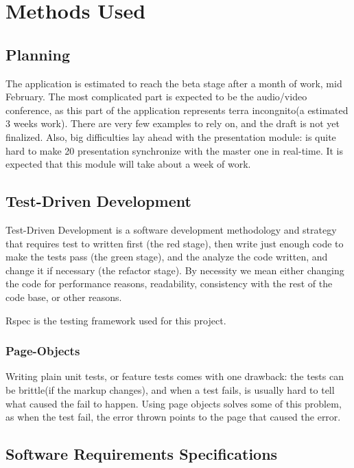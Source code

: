 
\chapter{Methods Used}
\label{Chapter2}

\section{Planning}
The application is estimated to reach the beta stage after a month of work, mid
February.
The most complicated part is expected to be the audio/video conference, as this
part of the application represents terra incongnito(a estimated 3 weeks work).
There are very few examples to rely on, and the draft is not yet finalized.
Also, big difficulties lay ahead with the presentation module: is quite hard to
make 20 presentation synchronize with the master one in real-time. It is
expected that this module will take about a week of work.

\section{Test-Driven Development}
Test-Driven Development is a software development methodology and strategy that
requires test to written first (the red stage), then write just enough code to
make the tests pass (the green stage), and the analyze the code written, and
change it if necessary (the refactor stage). By necessity we mean either changing
the code for performance reasons, readability, consistency with the rest of the
code base, or other reasons.

Rspec is the testing framework used for this project.
\subsection{Page-Objects}
Writing plain unit tests, or feature tests comes with one drawback: the tests
can be brittle(if the markup changes), and when a test fails, is usually hard to
tell what caused the fail to happen. Using page objects solves some of this
problem, as when the test fail, the error thrown points to the page that caused
the error.

\section{Software Requirements Specifications}

